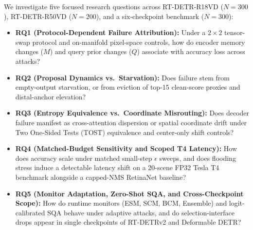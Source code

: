 \documentclass[preprint,10pt]{elsarticle}
\begin{document}
We investigate five focused research questions across RT-DETR-R18VD ($N=300$), RT-DETR-R50VD ($N=200$), and a six-checkpoint benchmark ($N=300$):
\begin{itemize}
    \item \textbf{RQ1 (Protocol-Dependent Failure Attribution):} Under a $2 \times 2$ tensor-swap protocol and on-manifold pixel-space controls, how do encoder memory changes ($M$) and query prior changes ($Q$) associate with accuracy loss across attacks?
    \item \textbf{RQ2 (Proposal Dynamics vs.\ Starvation):} Does failure stem from empty-output starvation, or from eviction of top-15 clean-score proxies and distal-anchor elevation?
    \item \textbf{RQ3 (Entropy Equivalence vs.\ Coordinate Misrouting):} Does decoder failure manifest as cross-attention dispersion or spatial coordinate drift under Two One-Sided Tests (TOST) equivalence and center-only shift controls?
    \item \textbf{RQ4 (Matched-Budget Sensitivity and Scoped T4 Latency):} How does accuracy scale under matched small-step $\epsilon$ sweeps, and does flooding stress induce a detectable latency shift on a 20-scene FP32 Tesla T4 benchmark alongside a capped-NMS RetinaNet baseline?
    \item \textbf{RQ5 (Monitor Adaptation, Zero-Shot SQA, and Cross-Checkpoint Scope):} How do runtime monitors (ESM, SCM, BCM, Ensemble) and logit-calibrated SQA behave under adaptive attacks, and do selection-interface drops appear in single checkpoints of RT-DETRv2 and Deformable DETR?
\end{itemize}
\end{document}

